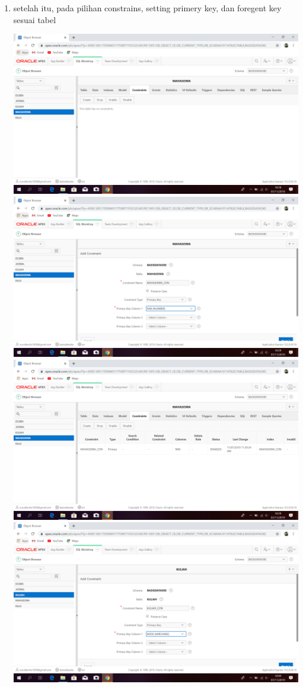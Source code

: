 \documentclass{article}
\begin{document}
\begin{enumerate}
\begin{enumerate}
    \item setelah itu, pada pilihan constrains, setting primery key, dan foregent key sesuai tabel 
    \begin{center}
    \includegraphics[width=.8\textwidth]{figure/30.PNG}
    \includegraphics[width=.8\textwidth]{figure/31.PNG}
    \includegraphics[width=.8\textwidth]{figure/32.PNG}
    \includegraphics[width=.8\textwidth]{figure/33.PNG}

\end{center}
\end{enumerate}
\end{enumerate}
\end{document}
